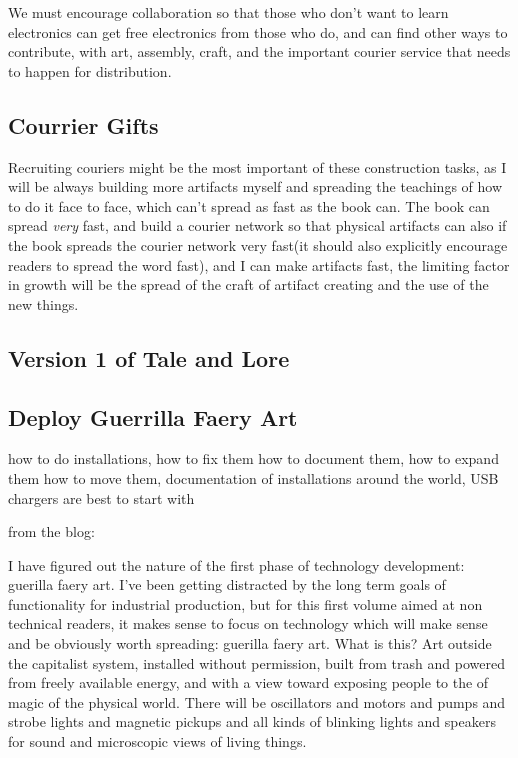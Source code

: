 We must encourage collaboration so that those who don't want to learn
electronics can get free electronics from those who do, and can find
other ways to contribute, with art, assembly, craft, and the important
courier service that needs to happen for distribution.

\subsection{Courrier Gifts}\label{courrier-gifts}

Recruiting couriers might be the most important of these construction
tasks, as I will be always building more artifacts myself and spreading
the teachings of how to do it face to face, which can't spread as fast
as the book can. The book can spread \emph{very} fast, and build a
courier network so that physical artifacts can also if the book spreads
the courier network very fast(it should also explicitly encourage
readers to spread the word fast), and I can make artifacts fast, the
limiting factor in growth will be the spread of the craft of artifact
creating and the use of the new things.

\subsection{Version 1 of Tale and
Lore}\label{version-1-of-tale-and-lore}

\subsection{Deploy Guerrilla Faery
Art}\label{deploy-guerrilla-faery-art}

how to do installations, how to fix them how to document them, how to
expand them how to move them, documentation of installations around the
world, USB chargers are best to start with

from the blog:

I have figured out the nature of the first phase of technology
development: guerilla faery art. I've been getting distracted by the
long term goals of functionality for industrial production, but for this
first volume aimed at non technical readers, it makes sense to focus on
technology which will make sense and be obviously worth spreading:
guerilla faery art. What is this? Art outside the capitalist system,
installed without permission, built from trash and powered from freely
available energy, and with a view toward exposing people to the of magic
of the physical world. There will be oscillators and motors and pumps
and strobe lights and magnetic pickups and all kinds of blinking lights
and speakers for sound and microscopic views of living things.

